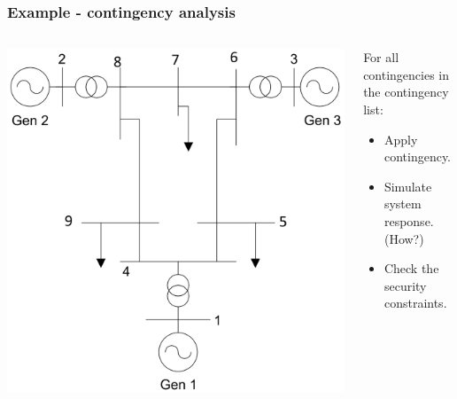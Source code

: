 \documentclass[compress]{beamer}
\begin{document}
\begin{frame}
  \frametitle{Example - contingency analysis}
  \begin{columns}
    \begin{column}{0.5\textwidth}
\includegraphics[width=\textwidth]{Figs/ieee9.png}
    \end{column}
    \begin{column}{0.5\textwidth}
For all contingencies in the contingency list:
      \begin{itemize}
      \item Apply contingency.
      \item Simulate system response. (How?)
      \item Check the security constraints.
      \end{itemize}
    \end{column}
  \end{columns}
\end{frame}
\end{document}
